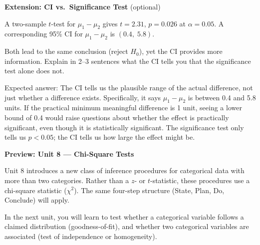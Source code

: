 \documentclass[10pt]{article}
\begin{document}
\begin{extensionbox}
\textbf{Extension: CI vs.\ Significance Test} (optional)

A two-sample $t$-test for $\mu_1 - \mu_2$ gives $t = 2.31$, $p = 0.026$ at $\alpha = 0.05$.
A corresponding 95\% CI for $\mu_1 - \mu_2$ is $(0.4,\; 5.8)$.

Both lead to the same conclusion (reject $H_0$), yet the CI provides more information. Explain
in 2--3 sentences what the CI tells you that the significance test alone does not.

\begin{teachernote}
Expected answer: The CI tells us the plausible range of the actual difference, not just
whether a difference exists. Specifically, it says $\mu_1 - \mu_2$ is between 0.4 and 5.8
units. If the practical minimum meaningful difference is 1 unit, seeing a lower bound of 0.4
would raise questions about whether the effect is practically significant, even though it is
statistically significant. The significance test only tells us $p < 0.05$; the CI tells us how large the effect might be.
\end{teachernote}
\end{extensionbox}

\begin{reflectionbox}
\textbf{Preview: Unit 8 --- Chi-Square Tests}

Unit 8 introduces a new class of inference procedures for categorical data with more than two
categories. Rather than a $z$- or $t$-statistic, these procedures use a chi-square statistic
($\chi^2$). The same four-step structure (State, Plan, Do, Conclude) will apply.

In the next unit, you will learn to test whether a categorical variable follows a claimed
distribution (goodness-of-fit), and whether two categorical variables are associated
(test of independence or homogeneity).
\end{reflectionbox}
\end{document}
